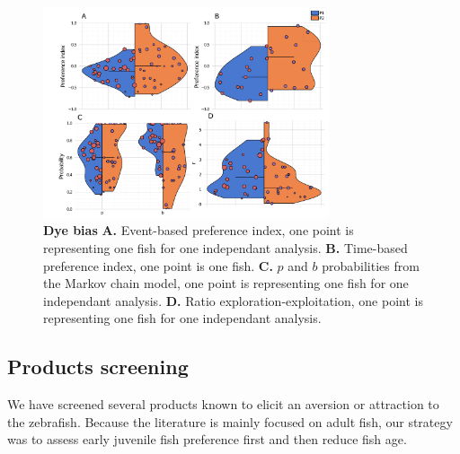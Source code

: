     \begin{figure}[H]
      \centering
      \includegraphics[width=0.75\textwidth]{part_2/assets/dye_pi.png}
      \caption{\textbf{Dye bias} \textbf{A.} Event-based preference index, one point is representing one fish for one independant analysis. \textbf{B.} Time-based preference index, one point is one fish. \textbf{C.} $p$ and $b$ probabilities from the Markov chain model, one point is representing one fish for one independant analysis. \textbf{D.} Ratio exploration-exploitation, one point is representing one fish for one independant analysis.}
      \label{dye_bias}
    \end{figure}

  \subsection{Products screening}
  We have screened several products known to elicit an aversion or attraction to the zebrafish. Because the literature is mainly focused on adult fish, our strategy was to assess early juvenile fish preference first and then reduce fish age.

